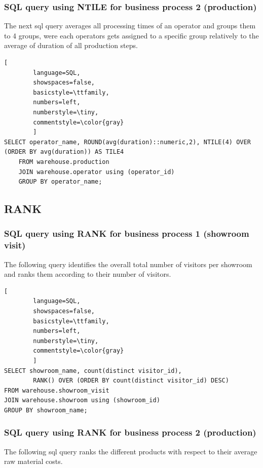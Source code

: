 \documentclass[letterpaper,12pt]{article}
\begin{document}
\subsubsection{SQL query using NTILE for business process 2 (production)}

The next sql query averages all processing times of an operator and groups them to 4 groups, were each operators gets assigned to a specific group relatively to the average of duration of all production steps.

\begin{lstlisting}[
        language=SQL,
        showspaces=false,
        basicstyle=\ttfamily,
        numbers=left,
        numberstyle=\tiny,
        commentstyle=\color{gray}
        ]
SELECT operator_name, ROUND(avg(duration)::numeric,2), NTILE(4) OVER (ORDER BY avg(duration)) AS TILE4
	FROM warehouse.production
	JOIN warehouse.operator using (operator_id)
	GROUP BY operator_name;
\end{lstlisting}

\subsection{RANK}

\subsubsection{SQL query using RANK for business process 1 (showroom visit)}

The following query identifies the overall total number of visitors per showroom and ranks them according to their number of visitors.

\begin{lstlisting}[
        language=SQL,
        showspaces=false,
        basicstyle=\ttfamily,
        numbers=left,
        numberstyle=\tiny,
        commentstyle=\color{gray}
        ]
SELECT showroom_name, count(distinct visitor_id), 
        RANK() OVER (ORDER BY count(distinct visitor_id) DESC)
FROM warehouse.showroom_visit
JOIN warehouse.showroom using (showroom_id)
GROUP BY showroom_name;
\end{lstlisting}

\subsubsection{SQL query using RANK for business process 2 (production)}

The following sql query ranks the different products with respect to their average raw material costs.
\end{document}
